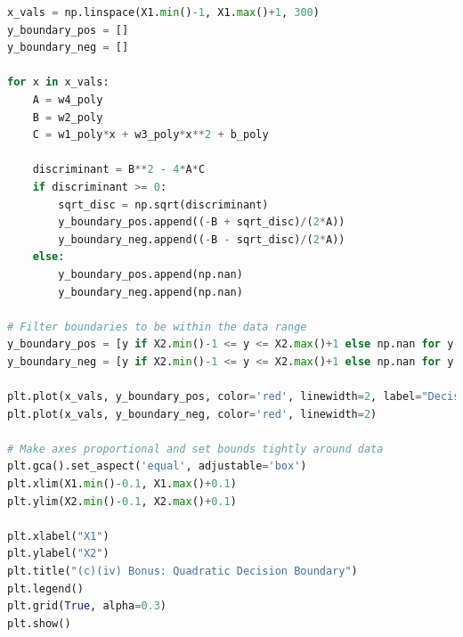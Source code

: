 \documentclass[12pt,a4paper]{article}
\begin{document}
\begin{lstlisting}[language=Python]
x_vals = np.linspace(X1.min()-1, X1.max()+1, 300)
y_boundary_pos = []
y_boundary_neg = []

for x in x_vals:
    A = w4_poly
    B = w2_poly
    C = w1_poly*x + w3_poly*x**2 + b_poly

    discriminant = B**2 - 4*A*C
    if discriminant >= 0:
        sqrt_disc = np.sqrt(discriminant)
        y_boundary_pos.append((-B + sqrt_disc)/(2*A))
        y_boundary_neg.append((-B - sqrt_disc)/(2*A))
    else:
        y_boundary_pos.append(np.nan)
        y_boundary_neg.append(np.nan)

# Filter boundaries to be within the data range
y_boundary_pos = [y if X2.min()-1 <= y <= X2.max()+1 else np.nan for y in y_boundary_pos]
y_boundary_neg = [y if X2.min()-1 <= y <= X2.max()+1 else np.nan for y in y_boundary_neg]

plt.plot(x_vals, y_boundary_pos, color='red', linewidth=2, label="Decision Boundary")
plt.plot(x_vals, y_boundary_neg, color='red', linewidth=2)

# Make axes proportional and set bounds tightly around data
plt.gca().set_aspect('equal', adjustable='box')
plt.xlim(X1.min()-0.1, X1.max()+0.1)
plt.ylim(X2.min()-0.1, X2.max()+0.1)

plt.xlabel("X1")
plt.ylabel("X2")
plt.title("(c)(iv) Bonus: Quadratic Decision Boundary")
plt.legend()
plt.grid(True, alpha=0.3)
plt.show()

\end{lstlisting}
\end{document}
